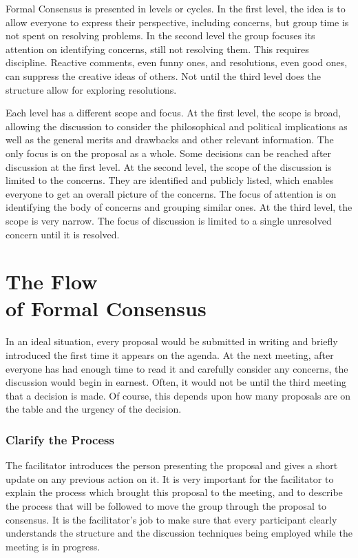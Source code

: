 Formal Consensus is presented in levels or cycles. In the first
level, the idea is to allow everyone to express their perspective,
including concerns, but group time is not spent on resolving
problems. In the second level the group focuses its attention on
identifying concerns, still not resolving them. This requires
discipline. Reactive comments, even funny ones, and resolutions,
even good ones, can suppress the creative ideas of others. Not
until the third level does the structure allow for exploring
resolutions.

Each level has a different scope and focus. At the first level,
the scope is broad, allowing the discussion to consider the
philosophical and political implications as well as the general
merits and drawbacks and other relevant information. The only focus
is on the proposal as a whole. Some decisions can be reached after
discussion at the first level. At the second level, the scope of
the discussion is limited to the concerns. They are identified and
publicly listed, which enables everyone to get an overall picture
of the concerns. The focus of attention is on identifying the
body of concerns and grouping similar ones. At the third level, the
scope is very narrow. The focus of discussion is limited to a
single unresolved concern until it is resolved.

\section[The Flow]{The Flow\\ of Formal Consensus}

In an ideal situation, every proposal would be submitted in
writing and briefly introduced the first time it appears on the
agenda. At the next meeting, after everyone has had enough time to
read it and carefully consider any concerns, the discussion would
begin in earnest. Often, it would not be until the third meeting
that a decision is made. Of course, this depends upon how many
proposals are on the table and the urgency of the decision.

\subsubsection*{Clarify the Process}

The facilitator introduces the person presenting the proposal and
gives a short update on any previous action on it. It is very
important for the facilitator to explain the process which brought
this proposal to the meeting, and to describe the process that will
be followed to move the group through the proposal to consensus. It
is the facilitator's job to make sure that every participant
clearly understands the structure and the discussion techniques
being employed while the meeting is in progress.

